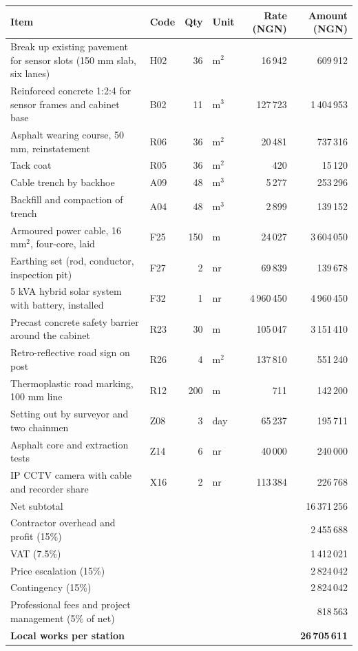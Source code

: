\begin{tabularx}{\textwidth}{@{}X l r l r r@{}}
\toprule
\textbf{Item} & \textbf{Code} & \textbf{Qty} & \textbf{Unit} & \textbf{Rate (NGN)} & \textbf{Amount (NGN)}\\
\midrule
Break up existing pavement for sensor slots (150 mm slab, six lanes) & H02 & 36 & m$^2$ & 16\,942 & 609\,912\\
Reinforced concrete 1:2:4 for sensor frames and cabinet base & B02 & 11 & m$^3$ & 127\,723 & 1\,404\,953\\
Asphalt wearing course, 50 mm, reinstatement & R06 & 36 & m$^2$ & 20\,481 & 737\,316\\
Tack coat & R05 & 36 & m$^2$ & 420 & 15\,120\\
Cable trench by backhoe & A09 & 48 & m$^3$ & 5\,277 & 253\,296\\
Backfill and compaction of trench & A04 & 48 & m$^3$ & 2\,899 & 139\,152\\
Armoured power cable, 16 mm$^2$, four-core, laid & F25 & 150 & m & 24\,027 & 3\,604\,050\\
Earthing set (rod, conductor, inspection pit) & F27 & 2 & nr & 69\,839 & 139\,678\\
5 kVA hybrid solar system with battery, installed & F32 & 1 & nr & 4\,960\,450 & 4\,960\,450\\
Precast concrete safety barrier around the cabinet & R23 & 30 & m & 105\,047 & 3\,151\,410\\
Retro-reflective road sign on post & R26 & 4 & m$^2$ & 137\,810 & 551\,240\\
Thermoplastic road marking, 100 mm line & R12 & 200 & m & 711 & 142\,200\\
Setting out by surveyor and two chainmen & Z08 & 3 & day & 65\,237 & 195\,711\\
Asphalt core and extraction tests & Z14 & 6 & nr & 40\,000 & 240\,000\\
IP CCTV camera with cable and recorder share & X16 & 2 & nr & 113\,384 & 226\,768\\
\midrule
Net subtotal & & & & & 16\,371\,256\\
Contractor overhead and profit (15\%) & & & & & 2\,455\,688\\
VAT (7.5\%) & & & & & 1\,412\,021\\
Price escalation (15\%) & & & & & 2\,824\,042\\
Contingency (15\%) & & & & & 2\,824\,042\\
Professional fees and project management (5\% of net) & & & & & 818\,563\\
\midrule
\textbf{Local works per station} & & & & & \textbf{26\,705\,611}\\
\bottomrule
\end{tabularx}
